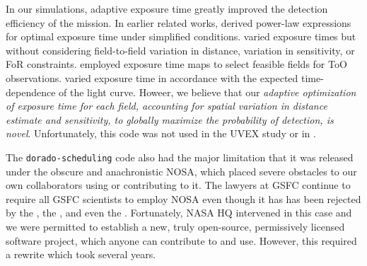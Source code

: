 \documentclass[twocolumn,times]{aastex631}
\begin{document}
In our simulations, adaptive exposure time greatly improved the detection efficiency of the mission. In earlier related works, \citet{2016ExA....42..165C} derived power-law expressions for optimal exposure time under simplified conditions. \citet{2017ApJ...834...84C} varied exposure times but without considering field-to-field variation in distance, variation in sensitivity, or \ac{FoR} constraints. \citet{2020A&C....3300425H} employed exposure time maps to select feasible fields for \ac{ToO} observations. \citet{2021RAA....21..308L} varied exposure time in accordance with the expected time-dependence of the light curve. Howeer, we believe that our \textit{adaptive optimization of exposure time for each field, accounting for spatial variation in distance estimate and sensitivity, to globally maximize the probability of detection, is novel}. Unfortunately, this code was not used in the \ac{UVEX} study or in \citet{2025arXiv250114109C}.

The \texttt{dorado-scheduling} code also had the major limitation that it was released under the obscure and anachronistic \ac{NOSA}, which placed severe obstacles to our own collaborators using or contributing to it. The lawyers at \ac{GSFC} continue to require all \ac{GSFC} scientists to employ \ac{NOSA} even though it has has been rejected by the \citet{FSF}, the \citet{NAP25217}, and even the \citet{SMD}. Fortunately, NASA \ac{HQ} intervened in this case and we were permitted to establish a new, truly open-source, permissively licensed software project, which anyone can contribute to and use. However, this required a rewrite which took several years.
\end{document}
